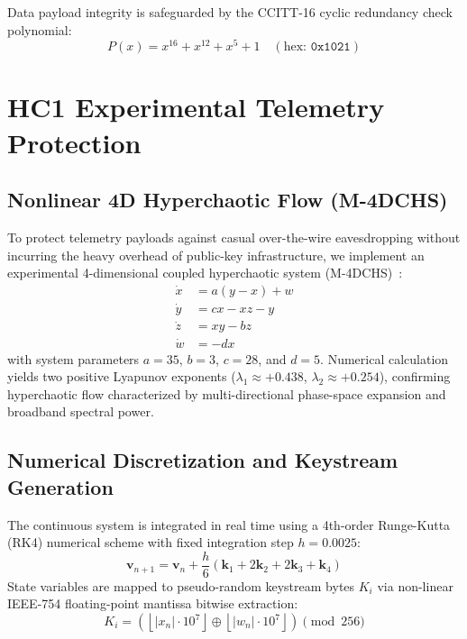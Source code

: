 \documentclass[conference]{IEEEtran}
\begin{document}
Data payload integrity is safeguarded by the CCITT-16 cyclic redundancy check polynomial:
\begin{equation}
    P(x) = x^{16} + x^{12} + x^5 + 1 \quad (\text{hex: } \texttt{0x1021})
    \label{eq:crc16}
\end{equation}

\section{HC1 Experimental Telemetry Protection}
\label{sec:hc1_encryption}

\subsection{Nonlinear 4D Hyperchaotic Flow (M-4DCHS)}
To protect telemetry payloads against casual over-the-wire eavesdropping without incurring the heavy overhead of public-key infrastructure, we implement an experimental 4-dimensional coupled hyperchaotic system (M-4DCHS)~\cite{sprott1994some}:
\begin{equation}
\begin{aligned}
    \dot{x} &= a(y - x) + w \\
    \dot{y} &= c x - x z - y \\
    \dot{z} &= x y - b z \\
    \dot{w} &= -d x
\end{aligned}
\label{eq:hyperchaos}
\end{equation}
with system parameters $a = 35$, $b = 3$, $c = 28$, and $d = 5$. Numerical calculation yields two positive Lyapunov exponents ($\lambda_1 \approx +0.438$, $\lambda_2 \approx +0.254$), confirming hyperchaotic flow characterized by multi-directional phase-space expansion and broadband spectral power.

\subsection{Numerical Discretization and Keystream Generation}
The continuous system is integrated in real time using a 4th-order Runge-Kutta (RK4) numerical scheme with fixed integration step $h = 0.0025$:
\begin{equation}
    \mathbf{v}_{n+1} = \mathbf{v}_n + \frac{h}{6}\left(\mathbf{k}_1 + 2\mathbf{k}_2 + 2\mathbf{k}_3 + \mathbf{k}_4\right)
    \label{eq:rk4}
\end{equation}
State variables are mapped to pseudo-random keystream bytes $K_i$ via non-linear IEEE-754 floating-point mantissa bitwise extraction:
\begin{equation}
    K_i = \left(\left\lfloor |x_n| \cdot 10^7 \right\rfloor \oplus \left\lfloor |w_n| \cdot 10^7 \right\rfloor\right) \pmod{256}
    \label{eq:keystream}
\end{equation}
\end{document}
